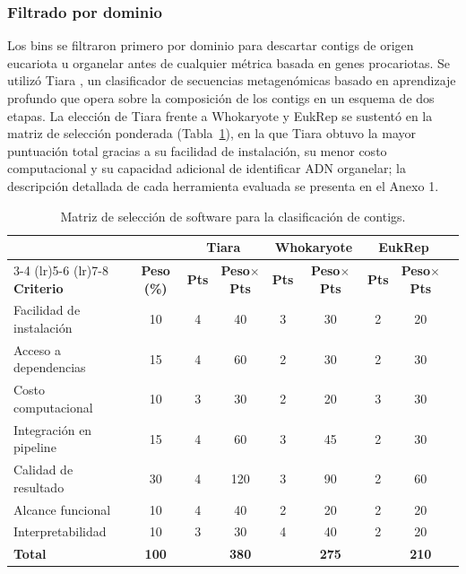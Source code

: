 \subsubsection{Filtrado por dominio}

Los bins se filtraron primero por dominio para descartar contigs de origen eucariota u organelar antes de cualquier métrica basada en genes procariotas. Se utilizó Tiara \cite{karlicki2022tiara}, un clasificador de secuencias metagenómicas basado en aprendizaje profundo que opera sobre la composición de los contigs en un esquema de dos etapas. La elección de Tiara frente a Whokaryote \cite{pronk2022whokaryote} y EukRep \cite{west2018genomereconstruction} se sustentó en la matriz de selección ponderada (Tabla~\ref{tab:seleccion_software}), en la que Tiara obtuvo la mayor puntuación total gracias a su facilidad de instalación, su menor costo computacional y su capacidad adicional de identificar ADN organelar; la descripción detallada de cada herramienta evaluada se presenta en el Anexo 1.

\begin{table}[H]
\centering
\footnotesize
\caption{Matriz de selección de software para la clasificación de contigs.}
\label{tab:seleccion_software}
\begin{tabular}{@{}lcccccccc@{}}
\toprule
& & \multicolumn{2}{c}{\textbf{Tiara}} & \multicolumn{2}{c}{\textbf{Whokaryote}} & \multicolumn{2}{c}{\textbf{EukRep}} \\
\cmidrule(lr){3-4} \cmidrule(lr){5-6} \cmidrule(lr){7-8}
\textbf{Criterio} & \textbf{Peso (\%)} & \textbf{Pts} & \textbf{Peso$\times$Pts} & \textbf{Pts} & \textbf{Peso$\times$Pts} & \textbf{Pts} & \textbf{Peso$\times$Pts} \\
\midrule
Facilidad de instalación & 10 & 4 & 40 & 3 & 30 & 2 & 20 \\
Acceso a dependencias & 15 & 4 & 60 & 2 & 30 & 2 & 30 \\
Costo computacional & 10 & 3 & 30 & 2 & 20 & 3 & 30 \\
Integración en pipeline & 15 & 4 & 60 & 3 & 45 & 2 & 30 \\
Calidad de resultado & 30 & 4 & 120 & 3 & 90 & 2 & 60 \\
Alcance funcional & 10 & 4 & 40 & 2 & 20 & 2 & 20 \\
Interpretabilidad & 10 & 3 & 30 & 4 & 40 & 2 & 20 \\
\midrule
\textbf{Total} & \textbf{100} & & \textbf{380} & & \textbf{275} & & \textbf{210} \\
\bottomrule
\end{tabular}
\end{table}

